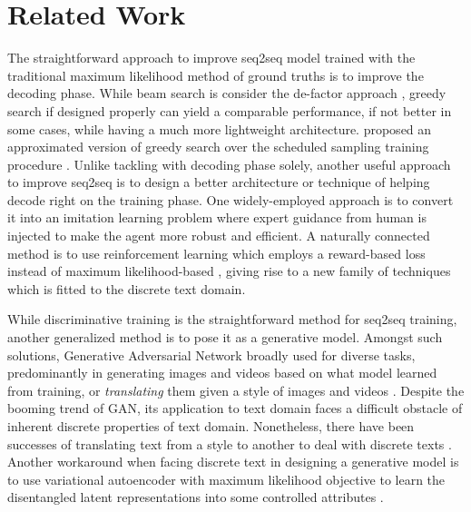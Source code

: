 \documentclass[11pt,a4paper]{article}
\begin{document}
\section{Related Work} \label{sec:related_work}%
The straightforward approach to improve seq2seq model trained with the traditional maximum likelihood method  of ground truths is to improve the decoding phase. While beam search is consider the de-factor approach \cite{seq2seq_2014}, greedy search if designed properly can yield a comparable performance, if not better in some cases, while having a much more lightweight architecture. \citet{goyal2017differentiable} proposed an approximated version of greedy search over the scheduled sampling training procedure \cite{bengio2015scheduled}. 
Unlike tackling with decoding phase solely, another useful approach to improve seq2seq is to design a better architecture or technique of helping decode right on the training phase. One widely-employed approach is to 
convert it into an imitation learning problem \cite{daume2009search,ross2011reduction,bengio2015scheduled} where expert guidance from human is injected to make the agent more robust and efficient. 
A naturally connected method is to use reinforcement learning \cite{sutton1998reinforcement} which employs a reward-based loss instead of maximum likelihood-based \cite{ranzato2015sequence, gu2017learning}, giving rise to a new family of techniques which is fitted to the discrete text domain. 

While discriminative training is the straightforward method for seq2seq training, another generalized method is to pose it as a generative model. Amongst such solutions, Generative Adversarial Network \cite{goodfellow2014generative} broadly used for diverse tasks, predominantly in generating images \cite{dcgan2015,berthelot2017began,zhang2017stackgan,progressive_gan_2017} and videos \cite{vondrick2016generating} based on what model learned from training, or \textit{translating} them given a style of images \cite{conditional_gan_2014,pix2pix2017,discoGAN2017,mechrez2017photorealistic,luan2017deep,zhu2017unpaired} and videos \cite{ruder2016artistic}. Despite the booming trend of GAN, its application to text domain faces a difficult obstacle of inherent discrete properties of text domain. Nonetheless, there have been successes of translating text from a style to another 
to deal with discrete texts \cite{boundaryseeking_gan_2017,yu2017seqgan,shen2017style}.  
Another workaround when facing discrete text in designing a generative model is to use variational autoencoder \cite{} with maximum likelihood objective to learn the disentangled latent representations into some controlled attributes \cite{controlled_text_gen_2017}. 
\end{document}
